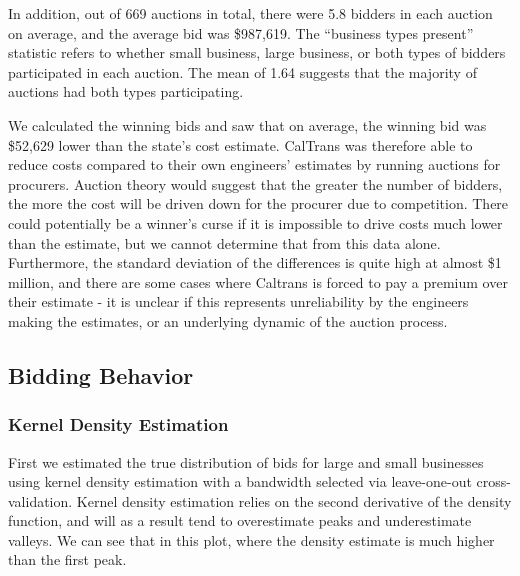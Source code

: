 In addition, out of 669 auctions in total, there were 5.8 bidders in
each auction on average, and the average bid was \$987,619.
The ``business types present'' statistic refers to whether small business,
large business, or both types of bidders participated in each auction. The
mean of 1.64 suggests that the majority of auctions had both types participating.

We calculated the winning bids and saw that on average, the winning bid was
\$52,629 lower than the state's cost estimate. CalTrans was therefore able to
reduce costs compared to their own engineers' estimates by running auctions for
procurers. Auction theory would suggest that the greater the number of bidders,
the more the cost will be driven down for the procurer due to competition.
There could potentially be a winner's curse if it is impossible to drive costs
much lower than the estimate, but we cannot determine that from this data alone.
Furthermore, the standard deviation of the differences is quite high
at almost \$1 million, and there are some cases where Caltrans
is forced to pay a premium over their estimate - it is unclear if this
represents unreliability by the engineers making the estimates,
or an underlying dynamic of the auction process.

\subsection{Bidding Behavior}

%

\subsubsection{Kernel Density Estimation}

First we estimated the true distribution of bids for large and
small businesses using kernel density estimation with a bandwidth
selected via leave-one-out cross-validation.
Kernel density estimation relies on the second derivative of the
density function, and will as a result tend to overestimate peaks and
underestimate valleys. We can see that in this plot, where
the density estimate is much higher than the first peak.

